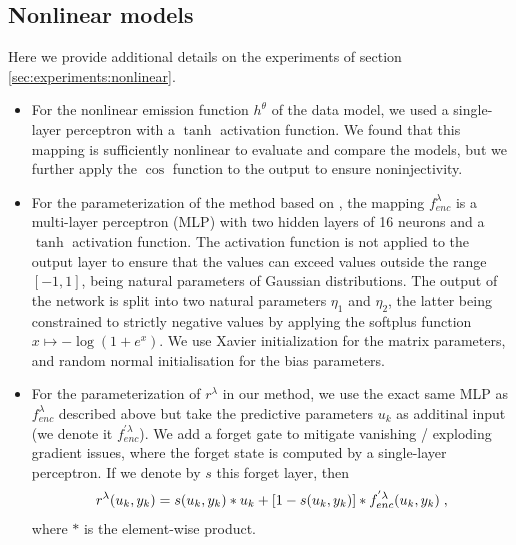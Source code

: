 \documentclass{article}
\begin{document}
\subsection{Nonlinear models}

Here we provide additional details on the experiments of section \ref{sec:experiments:nonlinear}. 

\begin{itemize}
    \item For the nonlinear emission function $h^\theta$ of the data model, we used a single-layer perceptron with a $\tanh$ activation function. We found that this mapping is sufficiently nonlinear to evaluate and compare the models, but we further apply the $\cos$ function to the output to ensure noninjectivity. 
    
    \item For the parameterization of the method based on \cite{johnson2016}, the mapping $f_{enc}^\lambda$ is a multi-layer perceptron (MLP) with two hidden layers of 16 neurons and a $\tanh$ activation function. The activation function is not applied to the output layer to ensure that the values can exceed values outside the range $[-1,1]$, being natural parameters of Gaussian distributions. The output of the network is split into two natural parameters $\eta_1$ and $\eta_2$, the latter being constrained to strictly negative values by applying the softplus function $x \mapsto -\log(1 +e^x)$. We use Xavier initialization for the matrix parameters, and random normal initialisation for the bias parameters. 
    \item For the parameterization of $r^\lambda$ in our method, we use the exact same MLP as $f_{enc}^\lambda$ described above but take the predictive parameters $u_k$ as additinal input (we denote it $f^{'\lambda}_{enc}$). We add a forget gate to mitigate vanishing / exploding gradient issues, where the forget state is computed by a single-layer perceptron. If we denote by $s$ this forget layer, then $$r^\lambda(u_k,y_k) = s(u_k,y_k) * u_k + \left[1 - s(u_k, y_k)\right] * f^{'\lambda}_{enc}(u_k, y_k)\;,$$ where $*$ is the element-wise product.
\end{itemize}
\end{document}
